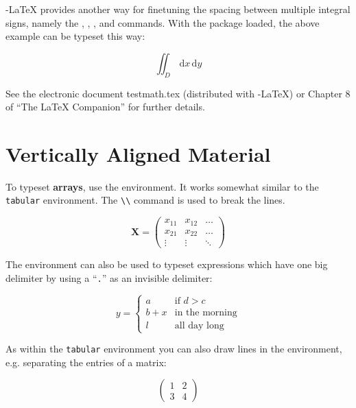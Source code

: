 \AmS-\LaTeX{} provides another way for finetuning
the spacing between multiple integral signs,
namely the , , , and  commands.
With the  package loaded, the above example can be
typeset this way:
\begin{example}
\newcommand{\ud}{\mathrm{d}}
\begin{displaymath}
\iint_{D} \, \ud x \, \ud y
\end{displaymath}
\end{example}

See the electronic document testmath.tex (distributed with
\AmS-\LaTeX) or Chapter 8 of ``The LaTeX Companion'' for further details.

\section{Vertically Aligned Material}
\label{sec:vert}

To typeset \textbf{arrays}, use the  environment. It works
somewhat similar to the \texttt{tabular} environment. The \verb|\\| command is
used to break the lines.
\begin{example}
\begin{displaymath}
\mathbf{X} =
\left( \begin{array}{ccc}
x_{11} & x_{12} & \ldots \\
x_{21} & x_{22} & \ldots \\
\vdots & \vdots & \ddots
\end{array} \right)
\end{displaymath}
\end{example}

The  environment can also be used to typeset expressions which have one
big delimiter by using a ``\verb|.|'' as an invisible  
delimiter:
\begin{example}
\begin{displaymath}
y = \left\{ \begin{array}{ll}
 a & \textrm{if $d>c$}\\
 b+x & \textrm{in the morning}\\
 l & \textrm{all day long}
  \end{array} \right.
\end{displaymath}
\end{example}

As within the \verb|tabular| environment you can also
draw lines in the  environment, e.g. separating the entries of
a matrix:
\begin{example}
\begin{displaymath}
\left(\begin{array}{c|c}
 1 & 2 \\
\hline
3 & 4
\end{array}\right)
\end{displaymath}
\end{example}



